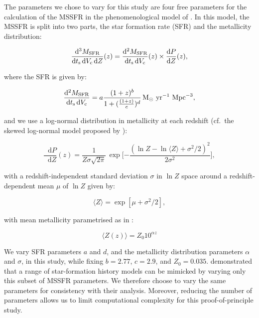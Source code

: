 \documentclass[twocolumn]{aastex631}
\newcommand*\diff{\mathop{}\!\mathrm{d}}
\newcommand{\MSFR}{\ensuremath{{M}_{\rm{SFR}}}\xspace}
\newcommand{\ts}{\ensuremath{{t}_{\rm{s}}}\xspace}
\newcommand{\Vc}{\ensuremath{{V}_{\rm{c}}}\xspace}
\newcommand{\resp}[1]{#1}
\begin{document}
The parameters we chose to vary for this study are four free parameters for the calculation of the \ac{MSSFR} in the phenomenological model of \citet{Neijssel_2019}. In this model, the \ac{MSSFR} is split into two parts, the star formation rate (SFR) and the metallicity distribution:


\begin{equation}
  \frac{\diff^3 \MSFR}{\diff \ts \diff \Vc \diff Z}(z) =
  \frac{\diff^2 \MSFR}{\diff \ts \diff \Vc }(z)
  \times
  \frac{\diff P }{\diff Z}(z),
\end{equation}

\noindent
where the SFR is given by:

\begin{equation}
  \frac{\diff^2 \MSFR}{\diff \ts \diff \Vc} =
  a\frac{(1 + z)^b}{1 + (\frac{(1 + z)}{c})^d}\,
  \mathrm{M}_\odot\ \mathrm{yr}^{-1}\ \mathrm{Mpc}^{-3},
\end{equation}

\bigskip\noindent
and we use a log-normal distribution in metallicity at each redshift (cf.~the skewed log-normal model proposed by \citet{vanSon_2022}):

\begin{equation}
  \frac{\diff P }{\diff Z}(z) =
  \frac{1}{Z\sigma\sqrt{2\pi}}\, \exp\bigg[{-\frac{(\ln Z-\ln \langle Z \rangle +\sigma^2/2)^2}{2\sigma^2}}\bigg],
\end{equation}

\bigskip\noindent
with a redshift-independent standard deviation $\sigma$ in $\ln Z$ space around a redshift-dependent mean $\mu$ of $\ln Z$ given by:

\begin{equation}
  \langle Z \rangle =
  \exp[\mu + \sigma^2/2],
\end{equation}

\bigskip\noindent
with mean metallicity parametrised as in \citet{Langer_2006}:

\begin{equation}
  \langle Z(z) \rangle =
  Z_{0}10^{\alpha{z}}
\end{equation}

\bigskip\noindent
We vary SFR parameters $a$ and $d$, and the metallicity distribution parameters $\alpha$ and $\sigma$, in this study, while fixing $b=2.77$, $c=2.9$, and $Z_0=0.035$.  \resp{\citet{Neijssel_2019} demonstrated that a range of star-formation history models can be mimicked by varying only this subset of \ac{MSSFR} parameters.  We therefore choose to vary the same parameters for consistency with their analysis.  Moreover, reducing the number of parameters allows us to limit computational complexity for this proof-of-principle study.}
\end{document}
